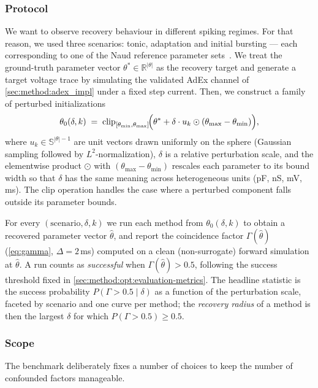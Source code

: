 \subsubsection{Protocol}\label{sec:method:opt:recovery-benchmark:protocol}
We want to observe recovery behaviour in different spiking regimes.
For that reason, we used three scenarios: tonic, adaptation and initial bursting --- each corresponding to one of the Naud reference parameter sets~\cite{Naud2008}.
We treat the ground-truth parameter vector $\theta^{*}\in\mathbb{R}^{|\theta|}$ as the recovery target and generate a target voltage trace by simulating the validated \gls{AdEx} channel of \cref{sec:method:adex_impl} under a fixed step current.
Then, we construct a family of perturbed initializations
\begin{equation}\label{eq:perturb}
    \theta_0(\delta, k) \;=\; \mathrm{clip}_{[\theta_{\min},\theta_{\max}]}\!\Bigl( \theta^{*} + \delta \cdot u_k \odot (\theta_{\max} - \theta_{\min}) \Bigr),
\end{equation}
where $u_k\in\mathbb{S}^{|\theta|-1}$ are unit vectors drawn uniformly on the sphere (Gaussian sampling followed by $L^{2}$-normalization), $\delta$ is a relative perturbation scale, and the elementwise product $\odot$ with $(\theta_{\max}-\theta_{\min})$ rescales each parameter to its bound width so that $\delta$ has the same meaning across heterogeneous units (pF, nS, mV, ms).
The clip operation handles the case where a perturbed component falls outside its parameter bounds.

For every $(\text{scenario}, \delta, k)$ we run each method from $\theta_0(\delta, k)$ to obtain a recovered parameter vector $\hat\theta$, and report the coincidence factor $\Gamma(\hat\theta)$ (\cref{eq:gamma}, $\Delta = 2$\,ms) computed on a clean (non-surrogate) forward simulation at $\hat\theta$.
A run counts as \emph{successful} when $\Gamma(\hat\theta) > 0.5$, following the success threshold fixed in \cref{sec:method:opt:evaluation-metrics}.
The headline statistic is the success probability $P(\Gamma > 0.5 \mid \delta)$ as a function of the perturbation scale, faceted by scenario and one curve per method;
the \emph{recovery radius} of a method is then the largest $\delta$ for which $P(\Gamma>0.5)\geq 0.5$.

\subsubsection{Scope}\label{sec:method:opt:recovery-benchmark:scope}
The benchmark deliberately fixes a number of choices to keep the number of confounded factors manageable.

